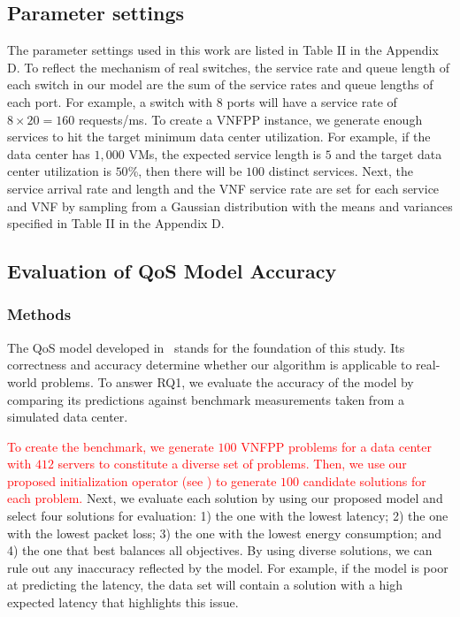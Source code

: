 \subsection{Parameter settings}
The parameter settings used in this work are listed in Table II in the Appendix D. To reflect the mechanism of real switches, the service rate and queue length of each switch in our model are the sum of the service rates and queue lengths of each port. For example, a switch with $8$ ports will have a service rate of $8\times 20=160$ requests/ms. To create a VNFPP instance, we generate enough services to hit the target minimum data center utilization. For example, if the data center has $1,000$ VMs, the expected service length is $5$ and the target data center utilization is $50$\%, then there will be $100$ distinct services. Next, the service arrival rate and length and the VNF service rate are set for each service and VNF by sampling from a Gaussian distribution with the means and variances specified in Table II in the Appendix D.

\subsection{Evaluation of QoS Model Accuracy}
\label{sec:model_accuracy}

\subsubsection{Methods}
The QoS model developed in~ stands for the foundation of this study. Its correctness and accuracy determine whether our algorithm is applicable to real-world problems. To answer RQ1, we evaluate the accuracy of the model by comparing its predictions against benchmark measurements taken from a simulated data center.

\textcolor{red}{To create the benchmark, we generate $100$ VNFPP problems for a data center with $412$ servers to constitute a diverse set of problems. Then, we use our proposed initialization operator (see ) to generate $100$ candidate solutions for each problem.} Next, we evaluate each solution by using our proposed model and select four solutions for evaluation: 1) the one with the lowest latency; 2) the one with the lowest packet loss; 3) the one with the lowest energy consumption; and 4) the one that best balances all objectives. By using diverse solutions, we can rule out any inaccuracy reflected by the model. For example, if the model is poor at predicting the latency, the data set will contain a solution with a high expected latency that highlights this issue. %

